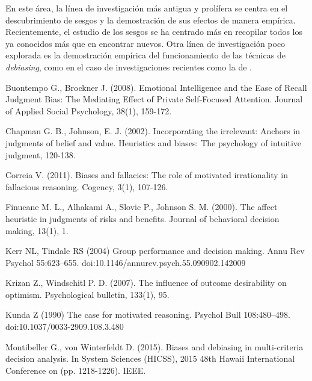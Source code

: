 \documentclass[a4paper,11pt]{article}
\begin{document}
En este área, la línea de investigación más antigua y prolífera se centra en el descubrimiento de sesgos y la demostración de sus efectos de manera empírica. Recientemente, el estudio de los sesgos se ha centrado más en recopilar todos los ya conocidos más que en encontrar nuevos. Otra línea de investigación poco explorada es la demostración empírica del funcionamiento de las técnicas de \textit{debiasing}, como en el caso de investigaciones recientes como la de \cite{montibeller2015}.




\begin{thebibliography}{}

Buontempo G., Brockner J. (2008). Emotional Intelligence and the Ease of Recall Judgment Bias: The Mediating Effect of Private Self‐Focused Attention. Journal of Applied Social Psychology, 38(1), 159-172.

Chapman G. B., Johnson, E. J. (2002). Incorporating the irrelevant: Anchors in judgments of belief and value. Heuristics and biases: The psychology of intuitive judgment, 120-138.

Correia V. (2011). Biases and fallacies: The role of motivated irrationality in fallacious reasoning. Cogency, 3(1), 107-126.

Finucane M. L., Alhakami A., Slovic P., Johnson S. M. (2000). The affect heuristic in judgments of risks and benefits. Journal of behavioral decision making, 13(1), 1.

Kerr NL, Tindale RS (2004) Group performance and decision making. Annu Rev Psychol 55:623–655. doi:10.1146/annurev.psych.55.090902.142009

Krizan Z., Windschitl P. D. (2007). The influence of outcome desirability on optimism. Psychological bulletin, 133(1), 95.

Kunda Z (1990) The case for motivated reasoning. Psychol Bull 108:480–498. doi:10.1037/0033-2909.108.3.480

Montibeller G., von Winterfeldt D. (2015). Biases and debiasing in multi-criteria decision analysis. In System Sciences (HICSS), 2015 48th Hawaii International Conference on (pp. 1218-1226). IEEE.


\end{thebibliography}
\end{document}
